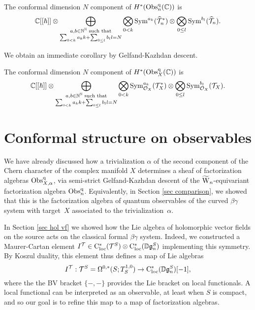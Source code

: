 \begin{prop}
The conformal dimension $N$ component of $H^*({\rm Obs}^{\rm q}_n(\mathbb C))$ is
\[
\mathbb C[[\hbar]] \otimes \bigoplus_{\substack{a,b \in \mathbb N^\mathbb N \text{ such that}\\ \sum_{0 < k} a_k k + \sum_{0 \leq l} b_l l = N}} \bigotimes_{0 <k } {\rm Sym}^{a_k}(\widehat{\mathcal T}_n^*) \otimes \bigotimes_{0 \leq l } {\rm Sym}^{b_l}(\widehat{\mathcal T}_n).
\]
\end{prop}

We obtain an immediate corollary by Gelfand-Kazhdan descent.

\begin{cor}
The conformal dimension $N$ component of $H^*({\rm Obs}^{\rm q}_X(\mathbb C))$ is
\[
\mathbb C[[\hbar]] \otimes \bigoplus_{\substack{a,b \in \mathbb N^\mathbb N \text{ such that}\\ \sum_{0 < k} a_k k + \sum_{0 \leq l} b_l l = N}} \bigotimes_{0 <k } {\rm Sym}^{a_k}_{\mathcal O_X}(\mathcal T^*_X) \otimes \bigotimes_{0 \leq l } {\rm Sym}^{b_l}_{\mathcal O_X}(\mathcal T_X).
\]
\end{cor}

\section{Conformal structure on observables}\label{sec conformal obs}

We have already discussed how a trivialization $\alpha$ of the second component of the Chern character of the complex manifold $X$ determines a sheaf of factorization algebras ${\rm Obs}^{\rm q}_{X,\alpha}$,
via semi-strict Gelfand-Kazhdan descent of the $\widetilde{{{\rm W}}}_n$-equivariant factorization algebra ${\rm Obs}^{\rm q}_n$. 
Equivalently, in Section \ref{sec comparison}, we showed that this is the factorization algebra of quantum observables of the curved $\beta\gamma$ system with target~$X$ associated to the trivialization~$\alpha$. 

In Section \ref{sec hol vf} we showed how the Lie algebra of holomorphic vector fields on the source acts on the classical formal $\beta\gamma$ system. 
Indeed, we constructed a Maurer-Cartan element $I^\mathcal T \in {\rm C}_{\rm loc}^*(\mathcal T^S) \otimes {\rm C}_{\rm loc}^*(\mathbb D \mathfrak g_n^S)$ implementing this symmetry. 
By Koszul duality, this element thus defines a map of Lie algebras 
\[
I^\mathcal T: \mathcal T^S = \Omega^{0,*}(S; T^{1,0}_S) \to {\rm C}_{\rm loc}^*(\mathbb D \mathfrak g_n^S)[-1], 
\]
where the the BV bracket $\{-,-\}$ provides the Lie bracket on local functionals.
A local functional can be interpreted as an observable, at least when $S$ is compact,
and so our goal is to refine this map to a map of factorization algebras.

